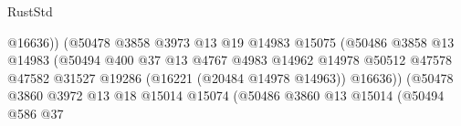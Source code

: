 \begin{lexlean}{RustStd}
\begin{coremodule}
                                                        @16636))
                                                    (@50478
                                                      @3858
                                                      @3973
                                                      @13
                                                      @19
                                                      @14983
                                                      @15075
                                                      (@50486
                                                        @3858
                                                        @13
                                                        @14983
                                                        (@50494
                                                          @400
                                                          @37
                                                          @13
                                                          @4767
                                                          @4983
                                                          @14962
                                                          @14978
                                                          @50512
                                                          @47578
                                                          @47582
                                                          @31527
                                                          @19286
                                                          (@16221 (@20484 @14978 @14963))
                                                          @16636))
                                                      (@50478
                                                        @3860
                                                        @3972
                                                        @13
                                                        @18
                                                        @15014
                                                        @15074
                                                        (@50486
                                                          @3860
                                                          @13
                                                          @15014
                                                          (@50494
                                                            @586
                                                            @37

\end{coremodule}
\end{lexlean}
